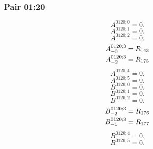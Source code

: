 \documentclass[11pt,a4paper]{article}
\begin{document}
\subsubsection{Pair 01:20}
\begin{equation}
A^{0120;0}=0.
\label{eq:cat-map-126}
\end{equation}
\begin{equation}
A^{0120;1}=0.
\label{eq:cat-map-127}
\end{equation}
\begin{equation}
A^{0120;2}=0.
\label{eq:cat-map-128}
\end{equation}
\begin{equation}
\shortstack[l]{$\displaystyle A^{0120;3}_{-3}=R_{143}$\\
$\displaystyle A^{0120;3}_{-2}=R_{175}$}
\label{eq:cat-map-129}
\end{equation}
\begin{equation}
A^{0120;4}=0.
\label{eq:cat-map-130}
\end{equation}
\begin{equation}
A^{0120;5}=0.
\label{eq:cat-map-131}
\end{equation}
\begin{equation}
B^{0120;0}=0.
\label{eq:cat-map-132}
\end{equation}
\begin{equation}
B^{0120;1}=0.
\label{eq:cat-map-133}
\end{equation}
\begin{equation}
B^{0120;2}=0.
\label{eq:cat-map-134}
\end{equation}
\begin{equation}
\shortstack[l]{$\displaystyle B^{0120;3}_{-2}=R_{176}$\\
$\displaystyle B^{0120;3}_{-1}=R_{177}$}
\label{eq:cat-map-135}
\end{equation}
\begin{equation}
B^{0120;4}=0.
\label{eq:cat-map-136}
\end{equation}
\begin{equation}
B^{0120;5}=0.
\label{eq:cat-map-137}
\end{equation}
\end{document}
